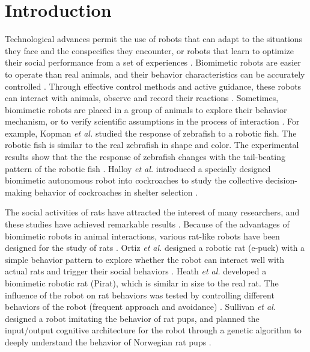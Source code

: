\section{Introduction}
Technological advances permit the use of robots that can adapt to the situations
they face and the conspecifics they encounter, or robots that learn to optimize
their social performance from a set of experiences \cite{animal-in-the-loop}.
Biomimetic robots are easier to operate than real animals, and their behavior
characteristics can be accurately controlled \cite{abdai_poking_the_futhre,
yeager_new_tech}. Through effective control methods and active guidance, these
robots can interact with animals, observe and record their reactions
\cite{son_entice_insect,Taylor2008frogs-17969,kopman_closed_loop_zebrafish,
partan_wild_tree,5650930}. Sometimes, biomimetic robots are placed in a group of
animals to explore their behavior mechanism, or to verify scientific assumptions
in the process of interaction \cite{doi:10.1126science.1144259,ward_quorum,
gribovskiy_mobile_robot,faria_novel_method}. For example, Kopman \textit{et al.}
studied the response of zebrafish to a robotic fish. The robotic fish is similar
to the real zebrafish in shape and color. The experimental results show that the
the response of zebrafish changes with the tail-beating pattern of the robotic
fish \cite{kopman_closed_loop_zebrafish}. Halloy \textit{et al.} introduced a
specially designed biomimetic autonomous robot into cockroaches to study the
collective decision-making behavior of cockroaches in shelter selection
\cite{doi:10.1126science.1144259}.

The social activities of rats have attracted the interest of many researchers,
and these studies have achieved remarkable results
\cite{fleliz_bidirectional_modulation,weiss_shall_two_walk}. Because of the
advantages of biomimetic robots in animal interactions, various rat-like robots
have been designed for the study of rats \cite{Lucas2018DesignOA,Shi_bb_2013,
Shi_bb_2015,shi-gao-tro-2022}. Ortiz \textit{et al.} designed a robotic rat
(e-puck) with a simple behavior pattern to explore whether the robot can
interact well with actual rats and trigger their social behaviors
\cite{Rusalky-sit}. Heath \textit{et al.} developed a biomimetic robotic rat (Pirat),
which is similar in size to the real rat. The influence of the robot on rat
behaviors was tested by controlling different behaviors of the robot (frequent
approach and avoidance) \cite{pirat}. Sullivan \textit{et al.} designed a robot
imitating the behavior of rat pups, and planned the input/output cognitive
architecture for the robot through a genetic algorithm to deeply understand the
behavior of Norwegian rat pups \cite{sullivan-arl-2015}.


